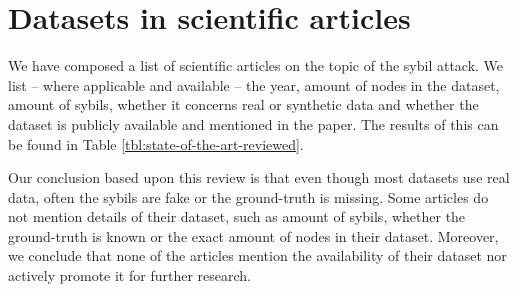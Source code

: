 \section{Datasets in scientific articles}
	\label{sct:datasets_articles}
	
	We have composed a list of scientific articles on the topic of the sybil attack. 
	We list -- where applicable and available -- the year, amount of nodes in the dataset, amount of sybils, whether it concerns real or synthetic data and whether the dataset is publicly available and mentioned in the paper.
	The results of this can be found in Table \ref{tbl:state-of-the-art-reviewed}.
	
	Our conclusion based upon this review is that even though most datasets use real data, often the sybils are fake or the ground-truth is missing.
	Some articles do not mention details of their dataset, such as amount of sybils, whether the ground-truth is known or the exact amount of nodes in their dataset.
	Moreover, we conclude that none of the articles mention the availability of their dataset nor actively promote it for further research.